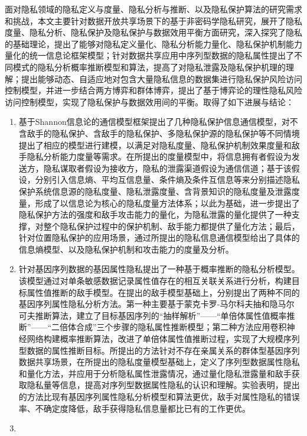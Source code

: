 面对隐私领域的隐私定义与度量、隐私分析与推断、以及隐私保护算法的研究需求和挑战，本文主要针对数据开放共享场景下的基于非密码学隐私研究，展开了隐私度量、隐私分析、隐私保护及隐私保护与数据效用平衡方面研究，深入探究了隐私的基础理论，提出了能够对隐私定义量化、隐私分析能力量化、隐私保护机制能力量化的统一信息论框架模型；针对数据共享应用中序列型数据的隐私属性提出了不同模式的隐私分析概率推断模型和算法，提高了对隐私泄露及隐私保护机理的理解；提出能够动态、自适应地对包含大量隐私信息的数据集进行隐私保护风险访问控制模型，并进一步结合两方博弈和群体博弈，提出了基于博弈论的理性隐私风险访问控制模型，实现了隐私保护与数据效用间的平衡。取得了如下进展与结论：
\begin{enumerate}
	\item 基于Shannon信息论的通信模型框架提出了几种隐私保护信息通信模型，对不含敌手的隐私保护、含敌手的隐私保护、多隐私保护源的隐私保护等不同情境提出了相应的模型进行建模，以满足对隐私度量、隐私保护机制效果度量和敌手隐私分析能力度量等需求。在所提出的度量模型中，将信息拥有者假设为发送方，隐私谋取者假设为接收方，隐私的泄露渠道假设为通信信道；基于该假设，分别引入信息熵、平均互信息量、条件熵及条件互信息等来分别描述隐私保护系统信息源的隐私度量、隐私泄露度量、含背景知识的隐私度量及泄露度量，形成了以信息论为核心的隐私度量方法体系；以此为基础，进一步提出了隐私保护方法的强度和敌手攻击能力的量化，为隐私泄露的量化提供了一种支撑，对整个隐私保护过程中的保护机制、敌手能力都提供了量化方法；最后，针对位置隐私保护的应用场景，通过所提出的隐私信息通信模型给出了具体的信息熵模型、以及隐私保护机制和攻击能力的度量及分析。
	\item 针对基因序列数据的基因属性隐私提出了一种基于概率推断的隐私分析模型。该模型通过对单条敏感数据记录属性值存在的相互关联关系进行分析，构建目标属性值推断的敌手模型。在提出的敌手模型基础上，分别提出了两种不同的基因序列属性隐私分析方法。第一种主要基于蒙克卡罗-马尔科夫抽和隐马尔可夫推断算法，建立了目标基因序列的“抽样解析”——“单倍体属性值概率推断”——“二倍体合成”三个步骤的隐私属性推断模型；第二种方法应用卷积神经网络构建概率推断算法，改进了单倍体属性值推断过程，实现了大规模序列型数据的属性推断目标。所提出的方法针对不存在亲属关系的群体型基因序列数据共享场景，在所提出的隐私度量模型基础上，定义了序列型数据属性隐私和量化方法，并应用于分析隐私属性泄露情况，通过量化隐私泄露量和敌手获取隐私量等信息，提高对序列型数据属性隐私的认识和理解。实验表明，提出的方法比现有基因序列属性隐私分析模型和算法更优，敌手对属性隐私的错误率、不确定度降低，敌手获得隐私信息量都比已有的工作更优。
	\item 

\end{enumerate}

